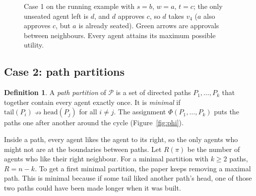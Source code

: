 \documentclass[11pt,a4paper]{article}
\theoremstyle{definition}
\newtheorem{definition}{Definition}
\theoremstyle{remark}
\theoremstyle{plain}
\newcommand{\nlikes}{\nrightarrow}
\newcommand{\cP}{\mathcal{P}}
\newcommand{\sqseat}[6]{%
  \coordinate (#1) at (0,1.3); \coordinate (#2) at (1.3,1.3);
  \coordinate (#3) at (1.3,0); \coordinate (#4) at (0,0);
  \draw[sedge] (#1)--(#2)--(#3)--(#4)--cycle;
  \draw[hot] (#5)--(#6);
  \node[ag#1] (#1) at (#1) {#1}; \node[ag#2] (#2) at (#2) {#2};
  \node[ag#3] (#3) at (#3) {#3}; \node[ag#4] (#4) at (#4) {#4};}
\begin{document}
\begin{figure}[h]
\centering
{}
\caption{Case 1 on the running example with $s=b$, $w=a$, $t=c$; the only unseated agent left is $d$, and $d$ approves $c$, so $d$ takes $v_4$ ($a$ also approves $c$, but $a$ is already seated). Green arrows are approvals between neighbours. Every agent attains its maximum possible utility.}
\label{fig:case1}
\end{figure}

\subsection{Case 2: path partitions}

\begin{definition}
A \emph{path partition} of $\cP$ is a set of directed paths $P_1,\dots,P_k$ that together contain every agent exactly once. It is \emph{minimal} if $\mathrm{tail}(P_i)\nlikes\mathrm{head}(P_j)$ for all $i\neq j$. The assignment $\Phi(P_1,\dots,P_k)$ puts the paths one after another around the cycle (Figure~\ref{fig:phi}).
\end{definition}

Inside a path, every agent likes the agent to its right, so the only agents who might not are at the boundaries between paths. Let $R(\pi)$ be the number of agents who like their right neighbour. For a minimal partition with $k\ge2$ paths, $R=n-k$. To get a first minimal partition, the paper keeps removing a maximal path. This is minimal because if some tail liked another path's head, one of those two paths could have been made longer when it was built.
\end{document}
